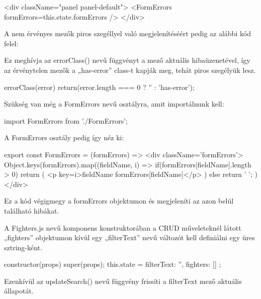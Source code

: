 \begin{cpp}
<div className="panel panel-default">
	<FormErrors formErrors={this.state.formErrors} />
</div>
\end{cpp}

A nem érvényes mezők piros szegéllyel való megjelenítéséért pedig az alábbi kód felel:


Ez meghívja az errorClass() nevű függvényt a mező aktuális hibaüzenetével, így az érvénytelen mezők a „has-error” class-t kapják meg, tehát piros szegélyük lesz.

\begin{cpp}
errorClass(error) {
    return(error.length === 0 ? '' : 'has-error');}
\end{cpp}

Szükség van még a FormErrors nevű osztályra, amit importálnunk kell:

\begin{cpp}
import { FormErrors } from './FormErrors';
\end{cpp}

A FormErrors osztály pedig így néz ki:

\begin{cpp}
export const FormErrors = ({formErrors}) =>
  <div className='formErrors'>
    {Object.keys(formErrors).map((fieldName, i) => {
      if(formErrors[fieldName].length > 0){
        return (
          <p key={i}>{fieldName} {formErrors[fieldName]}</p>
        )        
      } else {
        return ' ';
      } })} </div>
\end{cpp}

Ez a kód végigmegy a formErrors objektumon és megjeleníti az azon belül található hibákat.


A Fighters.js nevű komponens konstruktorában a CRUD műveleteknél látott „fighters” objektumon kívül egy „filterText” nevű változót kell definiálni egy üres sztring-ként.

\begin{cpp}
constructor(props) {
    super(props);
    this.state = {
      filterText: '',
      fighters: []
    };
  }
\end{cpp}

Ezenkívül az updateSearch() nevű függvény frissíti a filterText mező aktuális állapotát.

